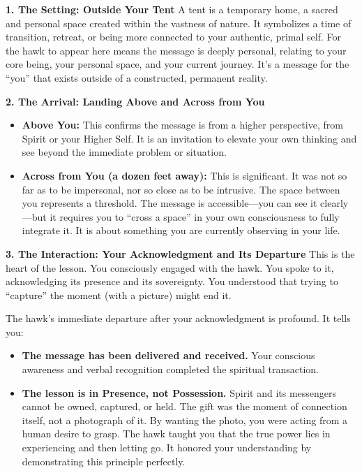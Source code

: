 \documentclass{article}
\begin{document}
\textbf{1. The Setting: Outside Your Tent} A tent is a temporary home, a
sacred and personal space created within the vastness of nature. It
symbolizes a time of transition, retreat, or being more connected to
your authentic, primal self. For the hawk to appear here means the
message is deeply personal, relating to your core being, your personal
space, and your current journey. It's a message for the ``you'' that
exists outside of a constructed, permanent reality.

\textbf{2. The Arrival: Landing Above and Across from You}

\begin{itemize}
\item
  \textbf{Above You:} This confirms the message is from a higher
  perspective, from Spirit or your Higher Self. It is an invitation to
  elevate your own thinking and see beyond the immediate problem or
  situation.
\item
  \textbf{Across from You (a dozen feet away):} This is significant. It
  was not so far as to be impersonal, nor so close as to be intrusive.
  The space between you represents a threshold. The message is
  accessible---you can see it clearly---but it requires you to ``cross a
  space'' in your own consciousness to fully integrate it. It is about
  something you are currently observing in your life.
\end{itemize}

\textbf{3. The Interaction: Your Acknowledgment and Its Departure} This
is the heart of the lesson. You consciously engaged with the hawk. You
spoke to it, acknowledging its presence and its sovereignty. You
understood that trying to ``capture'' the moment (with a picture) might
end it.

The hawk's immediate departure after your acknowledgment is profound. It
tells you:

\begin{itemize}
\item
  \textbf{The message has been delivered and received.} Your conscious
  awareness and verbal recognition completed the spiritual transaction.
\item
  \textbf{The lesson is in Presence, not Possession.} Spirit and its
  messengers cannot be owned, captured, or held. The gift was the moment
  of connection itself, not a photograph of it. By wanting the photo,
  you were acting from a human desire to grasp. The hawk taught you that
  the true power lies in experiencing and then letting go. It honored
  your understanding by demonstrating this principle perfectly.
\end{itemize}
\end{document}
